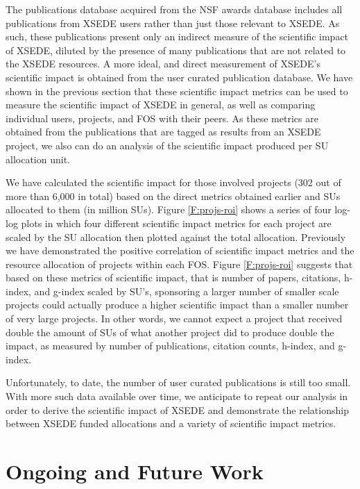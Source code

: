 \documentclass{sig-alternate}
\begin{document}
The publications database acquired from the NSF awards database includes all publications from XSEDE users rather than just those relevant to XSEDE. As such, these publications present only an indirect measure of the scientific impact of XSEDE, diluted by the presence of many publications that are not related to the XSEDE resources. A more ideal, and direct measurement of XSEDE's scientific impact is obtained from the user curated publication database. We have shown in the previous section that these scientific impact metrics can be used to measure the scientific impact of XSEDE in general, as well as comparing individual users, projects, and FOS with their peers. As these metrics are obtained from the publications that are tagged as results from an XSEDE project, we also can do an analysis of the scientific impact produced per SU allocation unit.

We have calculated the scientific impact for those involved projects (302 out of more than 6,000 in total) based on the direct metrics obtained earlier and SUs allocated to them (in million SUs). Figure \ref{F:projs-roi} shows a series of four log-log plots in which four different scientific impact metrics for each project are scaled by the SU allocation then plotted against the total allocation. Previously we have demonstrated the positive correlation of scientific impact metrics and the resource allocation of projects within each FOS. Figure \ref{F:projs-roi} suggests that based on these metrics of scientific impact, that is number of papers, citations, h-index, and g-index scaled by SU's, sponsoring a larger number of smaller scale projects could actually produce a higher scientific impact than a smaller number of very large projects. In other words, we cannot expect a project that received double the amount of SUs of what another project did to produce double the impact, as measured by number of publications, citation counts, h-index, and g-index.

Unfortunately, to date, the number of user curated publications is still too small. With more such data available over time, we anticipate to repeat our analysis in order to derive the scientific impact of XSEDE and demonstrate the relationship between XSEDE funded allocations and a variety of scientific impact metrics.

\section{Ongoing and Future Work} \label{S:futurework}
\end{document}
